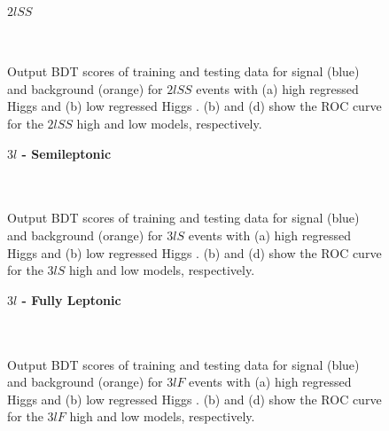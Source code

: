 \begin{figure}[H]
  \centering
  \textbf{$2lSS$}\\
  \\
  \\ 
  \caption{Output BDT scores of training and testing data for signal (blue) and background (orange) for $2lSS$ events with (a) high regressed Higgs \pt and (b) low regressed Higgs \pt. (b) and (d) show the ROC curve for the $2lSS$ high and low \pt models, respectively.}
  \label{fig:sigBkgScore2lSS}
\end{figure}

\begin{figure}[H]
  \centering
  \textbf{$3l$ - Semileptonic}\\
  \\                                   
  \\                                    
  \caption{Output BDT scores of training and testing data for signal (blue) and background (orange) for $3lS$ events with (a) high regressed Higgs \pt and (b) low regressed Higgs \pt. (b) and (d) show the ROC curve for the $3lS$ high and low \pt models, respectively.}
  \label{fig:sigBkgScore3lS}                                                                                                
\end{figure}

\begin{figure}[H]
  \centering
  \textbf{$3l$ - Fully Leptonic}\\
  \\                                  
  \\                                    
  \caption{Output BDT scores of training and testing data for signal (blue) and background (orange) for $3lF$ events with (a) high regressed Higgs \pt and (b) low regressed Higgs \pt. (b) and (d) show the ROC curve for the $3lF$ high and low \pt models, respectively.}
  \label{fig:sigBkgScore3lF}                                                                                                
\end{figure}

